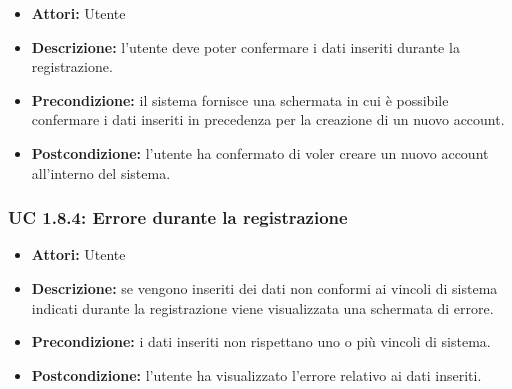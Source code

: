 \begin{itemize}
\item \textbf{Attori:} Utente
\item \textbf{Descrizione:} l'utente deve poter confermare i dati inseriti durante la registrazione.
\item \textbf{Precondizione:} il sistema fornisce una schermata in cui è possibile confermare i dati inseriti in precedenza per la creazione di un nuovo account.
\item \textbf{Postcondizione:} l'utente ha confermato di voler creare un nuovo account all'interno
del sistema.
\end{itemize}

\subsubsection{UC 1.8.4: Errore durante la registrazione}

\begin{itemize}
\item \textbf{Attori:} Utente
\item \textbf{Descrizione:} se vengono inseriti dei dati non conformi ai vincoli di sistema indicati durante la registrazione viene visualizzata una schermata di errore. 
\item \textbf{Precondizione:} i dati inseriti non rispettano uno o più vincoli di sistema.
\item \textbf{Postcondizione:} l'utente ha visualizzato l'errore relativo ai dati inseriti.
\end{itemize}


